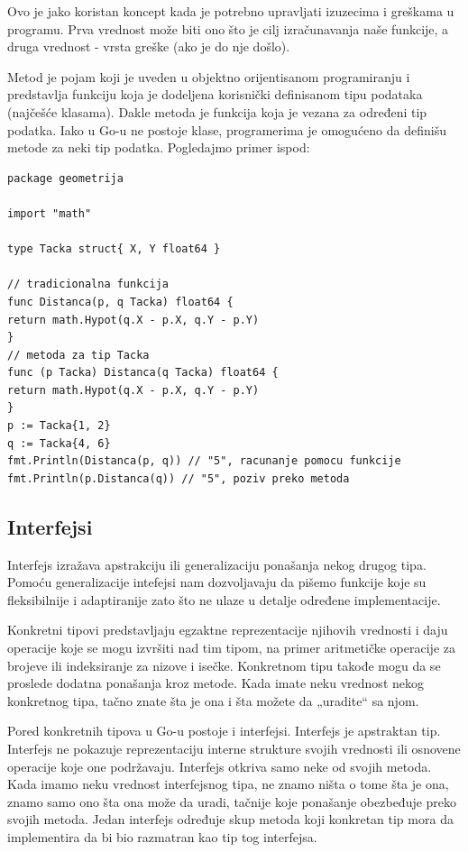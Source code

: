 \documentclass[a4paper]{article}
\begin{document}
Ovo je jako koristan koncept kada je potrebno upravljati izuzecima i greškama u programu. Prva vrednost može biti ono što je cilj izračunavanja naše funkcije, a druga vrednost - vrsta greške (ako je do nje došlo).

Metod je pojam koji je uveden u objektno orijentisanom programiranju i predstavlja funkciju koja je dodeljena korisnički definisanom tipu podataka (najčešće klasama). Dakle metoda je funkcija koja je vezana za određeni tip podatka. Iako u Go-u ne postoje klase, programerima je omogućeno da definišu metode za neki tip podatka. Pogledajmo primer ispod:

\begin{lstlisting}[caption={Primer metoda},frame=single, label=Primer_metoda]
package geometrija

import "math"

type Tacka struct{ X, Y float64 }

// tradicionalna funkcija
func Distanca(p, q Tacka) float64 {
return math.Hypot(q.X - p.X, q.Y - p.Y)
}
// metoda za tip Tacka
func (p Tacka) Distanca(q Tacka) float64 {
return math.Hypot(q.X - p.X, q.Y - p.Y)
}
p := Tacka{1, 2}
q := Tacka{4, 6}
fmt.Println(Distanca(p, q)) // "5", racunanje pomocu funkcije
fmt.Println(p.Distanca(q)) // "5", poziv preko metoda
\end{lstlisting}


\subsection{Interfejsi}
\label{subsec:interfejsi}

Interfejs izražava apstrakciju ili generalizaciju ponašanja nekog drugog tipa. Pomoću generalizacije intefejsi nam dozvoljavaju  da pišemo funkcije koje su fleksibilnije i adaptiranije zato što ne ulaze u detalje određene implementacije.

Konkretni tipovi predstavljaju egzaktne reprezentacije njihovih vrednosti i daju operacije koje se mogu izvršiti nad tim tipom, na primer aritmetičke operacije za brojeve ili indeksiranje za nizove i isečke. Konkretnom tipu takođe mogu da se proslede dodatna ponašanja kroz metode. Kada imate neku vrednost nekog konkretnog tipa, tačno znate šta je ona i šta možete da „uradite“ sa njom.

Pored konkretnih tipova u Go-u postoje i interfejsi. Interfejs je apstraktan tip. Interfejs ne pokazuje reprezentaciju interne strukture svojih vrednosti ili osnovene operacije koje one podržavaju. Interfejs otkriva samo neke od svojih metoda. Kada imamo neku vrednost interfejsnog tipa, ne znamo ništa o tome šta je ona, znamo samo ono šta ona može da uradi, tačnije koje ponašanje obezbeđuje preko svojih metoda.
Jedan interfejs određuje skup metoda koji konkretan tip mora da implementira da bi bio razmatran kao tip tog interfejsa. 
\end{document}
